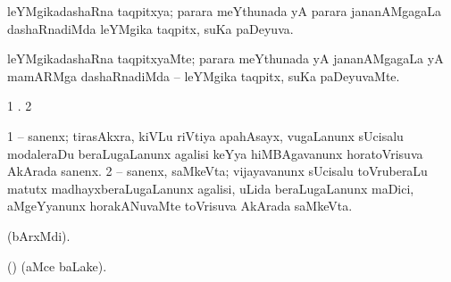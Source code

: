 \bentry
{} 
\gl{\gu}
\expl{}
\bmng
 leYMgikadashaRna taqpitxya; parara meYthunada yA parara jananAMgagaLa dashaRnadiMda leYMgika taqpitx, suKa paDeyuva. 
\emng
\eentry

\bentry
{} 
\gl{\kirxvi}
\expl{}
\bmng
 leYMgikadashaRna taqpitxyaMte; parara meYthunada yA jananAMgagaLa yA mamARMga dashaRnadiMda -- leYMgika taqpitx, suKa paDeyuvaMte. 
\emng
\eentry

\bentry
{}
\gl{\saMkiSx}
\expl{}
\bmng
\emng
\eentry

\bentry
{}
\gl{\saMkiSx}
\expl{\Latin }
\bmng
\bnum
\num{1}  . 
\num{2}  
\enum
\emng
\eentry

\bentry 
{}
\gl{\saMkiSx}
\expl{}
\bmng
\emng
\eentry

\bentry
{}
\gl{\saMkiSx}
\expl{}
\bmng
\emng
\eentry


\bentry
{} 
\gl{\nA}
\expl{}
\bmng
\bnum
\num{1}  -- sanenx; tirasAkxra, kiVLu riVtiya apahAsayx, \mo vugaLanunx sUcisalu modaleraDu beraLugaLanunx agalisi keYya hiMBAgavanunx horatoVrisuva  AkArada sanenx. 
\num{2}  -- sanenx, saMkeVta; vijayavanunx sUcisalu toVruberaLu matutx madhayxberaLugaLanunx agalisi, uLida beraLugaLanunx maDici, aMgeYyanunx horakANuvaMte toVrisuva  AkArada saMkeVta. 
\enum
\emng
\eentry

\bentry
{}
\gl{\saMkiSx}
\expl{}
\bmng
\emng
\eentry

\bentry
{} 
\gl{\saMkiSx}
\expl{}
\bmng
  (bArxMdi). 
\emng
\eentry

\bentry 
{}
\gl{\saMkiSx}
\expl{}
\bmng
 (\ame)  (aMce baLake). 
\emng
\eentry

\bentry
{}
\gl{\saMkiSx}
\expl{}
\bmng
\emng
\eentry

\bentry
{}
\gl{\saMkiSx}
\expl{}
\bmng
\emng
\eentry

\bentry
{} 
\gl{\saMkiSx}
\expl{}
\bmng
\emng
\eentry

